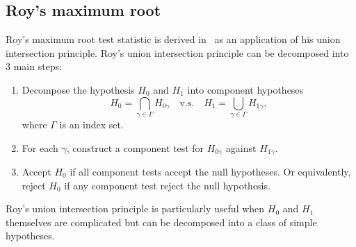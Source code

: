 \documentclass[12pt]{article} %
\theoremstyle{definition}
\begin{document}
\subsection{Roy's maximum root}
Roy's maximum root test statistic is derived in~\cite{Roy1953} as an application of his union intersection principle.
Roy's union intersection principle can be decomposed into $3$ main steps:
\begin{enumerate}
    \item
        Decompose the hypothesis $H_0$ and $H_1$ into component hypotheses
        $$
        H_0=\bigcap_{\gamma\in\Gamma} H_{0\gamma} \quad \text{v.s.} \quad 
        H_1=\bigcup_{\gamma\in \Gamma} H_{1\gamma},
        $$
        where $\Gamma$ is an index set.
    \item
        For each $\gamma$, construct a component test for $H_{0\gamma}$ against $H_{1\gamma}$.
    \item
        Accept $H_0$ if all component tests accept the null hypotheses.
        Or equivalently, reject $H_0$ if any component test reject the null hypothesis.
\end{enumerate}
Roy's union intersection principle is particularly useful when $H_0$ and $H_1$ themselves are complicated but can be decomposed into a class of simple hypotheses. %
\end{document}
